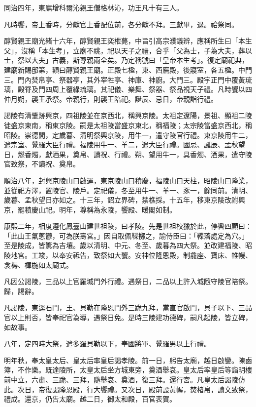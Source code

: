 \begin{pinyinscope}
同治四年，東廡增科爾沁親王僧格林沁，功王凡十有三人。

凡時饗，帝上香時，分獻官上香配位前，各分獻不拜。三獻畢，退。祫祭同。

醇賢親王廟光緒十六年，醇賢親王奕枻薨，中旨引高宗濮議辨，應稱所生曰「本生父」，沒稱「本生考」，立廟不祧，祀以天子之禮，合乎「父為士，子為大夫，葬以士，祭以大夫」古義，斯尊親兩全矣。乃定稱號曰「皇帝本生考」。復定廟祀典，建廟新賜邸第，額曰醇賢親王廟。正殿七楹，東、西廡殿，後寢室，各五楹。中門三。門內焚帛亭、祭器亭，其外宰牲亭、神庫、神廚。大門三。殿宇正門中覆黃琉璃，殿脊及門四周上覆綠琉璃。其祀儀、樂舞、祭器、祭品視天子禮。凡時饗以四仲月朔，襲王承祭。帝親行，則襲王陪祀。誕辰、忌日，帝親詣行禮。

謁陵有清肇跡興京，四祖陵並在京西北，稱興京陵。太祖定遼陽，景祖、顯祖二陵徙盛京東南，稱東京陵。嗣是太祖陵當盛京東北，稱福陵；太宗陵當盛京西北，稱昭陵。崇德間，定歲暮、清明祭興京陵，用牛一，遣守陵官行禮。東京陵用牛二，遣宗室、覺羅大臣行禮。福陵用牛一、羊二，遣大臣行禮。國忌、誕辰、孟秋望日，燃香燭，獻酒果，奠帛、讀祝、行禮。朔、望用牛一，具香燭、酒果，遣守陵官致祭，不讀祝、奠帛。

順治八年，封興京陵山曰啟運，東京陵山曰積慶，福陵山曰天柱，昭陵山曰隆業，並從祀方澤，置陵官、陵戶。定祀儀，冬至用牛一、羊一、豕一，餘同前。清明、歲暮、孟秋望日亦如之。十三年，詔立界碑，禁樵採。十五年，移東京陵改祔興京，罷積慶山祀。明年，尊稱為永陵，饗殿、暖閣如制。

康熙二年，相度遵化鳳臺山建世祖陵，曰孝陵。先是世祖校獵於此，停轡四顧曰：「此山王氣蔥鬱，可為朕壽宮。」因自取佩鞢擲之，諭侍臣曰：「鞢落處定為穴。」至是陵成，皆驚為吉壤。歲以清明、中元、冬至、歲暮為四大祭。並改建福陵、昭陵地宮。工竣，以奉安祗告，致祭如大饗。安神位隆恩殿，制龕座、寶床、帷幔、衾褥、楎椸如太廟式。

凡因公謁陵，三品以上官羅城門外行禮。遇祭日，二品以上許入城隨守陵官陪祭。歸，謁辭。

凡謁陵，東逕石門，王、貝勒在隆恩門外三跪九拜，當直官啟門，貝子以下、三品官以上則否，皆奉祀官為導，遇祭日免。是時三陵建功德碑，嗣凡起陵，皆立碑，如故事。

八年，定四時大祭，遣多羅貝勒以下，奉國將軍、覺羅男以上行禮。

明年秋，奉太皇太后、皇太后率皇后謁孝陵。前一日，躬告太廟，越日啟鑾。陳鹵簿，不作樂。既達陵所，太皇太后坐方城東旁，奠酒舉哀。皇太后率皇后等詣明樓前中立，六肅、三跪、三拜，隨舉哀、奠酒，復三拜。還行宮。凡皇太后謁陵仿此。次日，帝復謁隆恩殿，行大饗禮。又次日，殿前設黃幄，焚楮帛，讀文致祭，禮成。還京，仍告太廟。越二日，御太和殿，百官表賀。


\end{pinyinscope}
